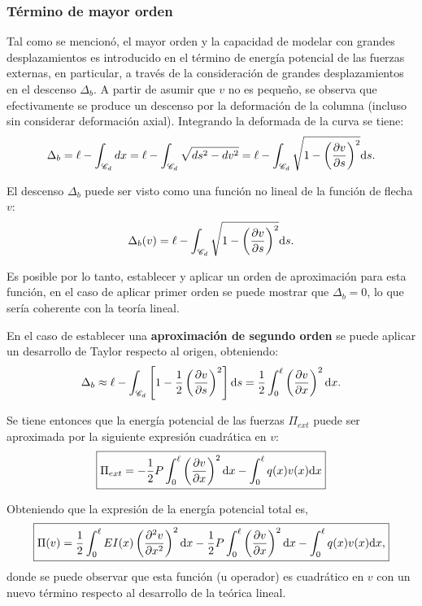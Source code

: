 \subsubsection{Término de mayor orden}

Tal como se mencionó, el mayor orden y la capacidad de modelar con grandes desplazamientos es introducido en el término de energía potencial de las fuerzas externas, en particular, a través de la consideración de grandes desplazamientos en el descenso $\Delta_b$. %
%
A partir de asumir que $v$ no es pequeño, se observa que efectivamente se produce un descenso por la deformación de la columna (incluso sin considerar deformación axial). Integrando la deformada de la curva se tiene:
%
\begin{equation}
\Delta_b = \ell - \int_{\mathscr{C}_d} dx = \ell - \int_{\mathscr{C}_d} \sqrt{ds^2-dv^2} = \ell - 
\int_{\mathscr{C}_d} \sqrt{1-\left(\frac{\partial v}{\partial s}\right)^2} {\text{d}} s.
\end{equation}

El descenso $\Delta_b$ puede ser visto como una función no lineal de la función de flecha $v$:
%
$$
\Delta_b(v) = \ell - 
\int_{\mathscr{C}_d} \sqrt{1-\left(\frac{\partial v}{\partial s}\right)^2} {\text{d}} s.
$$

Es posible por lo tanto, establecer y aplicar un orden de aproximación para esta función, en el caso de aplicar primer orden se puede mostrar que $\Delta_b=0$, lo que sería coherente con la teoría lineal. %
%

En el caso de establecer una \textbf{aproximación de segundo orden} se puede aplicar un desarrollo de Taylor respecto al origen, obteniendo:
%
\begin{equation}\label{eqn:deltab}
\Delta_b \approx \ell - \int_{\mathscr{C}_d} \left[1 - \frac{1}{2}\left(\frac{\partial v}{\partial s}\right)^2\right] {\text{d}} s = \frac{1}{2} \int_0^\ell \left(\frac{\partial v}{\partial x}\right)^2 {\text{d}} x.
\end{equation}

Se tiene entonces que la energía potencial de las fuerzas $\Pi_{ext}$ puede ser aproximada por la siguiente expresión cuadrática en $v$:
%
\begin{equation}
\boxed{
\Pi_{ext} = -\frac{1}{2} P \int_0^\ell  \left(\frac{\partial v}{\partial x}\right)^2 {\text{d}} x - \int_0^\ell q(x) v(x) {\text{d}} x
}
\end{equation}

Obteniendo que la expresión de la energía potencial total es,
%
\begin{equation}\label{eqn:energiatotal}
\boxed{
\Pi(v) =  \frac{1}{2} \int_0^\ell EI(x) \left( \frac{\partial^2 v}{\partial x^2}\right)^2 {\text{d}} x -\frac{1}{2} P \int_0^\ell  \left(\frac{\partial v}{\partial x}\right)^2 {\text{d}} x - \int_0^\ell q(x) v(x) {\text{d}} x,
}
\end{equation}
donde se puede observar que esta función (u operador) es cuadrático en $v$ con un nuevo término respecto al desarrollo de la teórica lineal.

